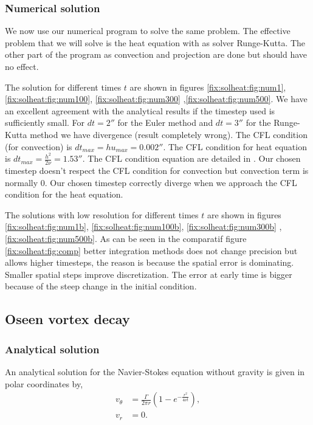 \subsubsection{Numerical solution}

We now use our numerical program to solve the same problem. The effective problem that we will solve is the heat equation with as solver Runge-Kutta.
The other part of the program as convection and projection are done but should have no effect.

The solution for different times $t$ are shown in figures \ref{fix:solheat:fig:num1}, \ref{fix:solheat:fig:num100}, \ref{fix:solheat:fig:num300} ,\ref{fix:solheat:fig:num500}. We have an excellent agreement with the analytical results if the timestep used is sufficiently small.
For $dt=2\second$ for the Euler method and $dt=\unit{3}{\second}$ for the Runge-Kutta method we have divergence (result completely wrong).
The CFL condition (for convection) is $dt_{max}=hu_{max}=\unit{0.002}{\second}$. The CFL condition for heat equation is $dt_{max}=\frac{h^2}{2\nu}=\unit{1.53}{\second}$.
The CFL condition equation are detailed in \cite{cfl_heat}.
Our chosen timestep doesn't respect the CFL condition for convection but convection term is normally 0. Our chosen timestep correctly diverge when we approach the CFL condition for the heat equation.

The solutions with low resolution for different times $t$ are shown in figures \ref{fix:solheat:fig:num1b}, \ref{fix:solheat:fig:num100b}, \ref{fix:solheat:fig:num300b} ,\ref{fix:solheat:fig:num500b}.
As can be seen in the comparatif figure \ref{fix:solheat:fig:comp} better integration methods does not change precision but allows
higher timesteps, the reason is because the spatial error is dominating. Smaller spatial steps improve discretization.
The error at early time is bigger because of the steep change in the initial condition.


\FloatBarrier
\subsection{Oseen vortex decay}

\subsubsection{Analytical solution}

An analytical solution for the Navier-Stokes equation without gravity is given in polar coordinates by,
\begin{align}\label{fixed:vortex}
 v_{\theta}&=\frac{\Gamma}{2\pi r}\left(1-e^{-\frac{r^2}{4\nu t}}\right),\\
 v_{r}&=0.
\end{align}

